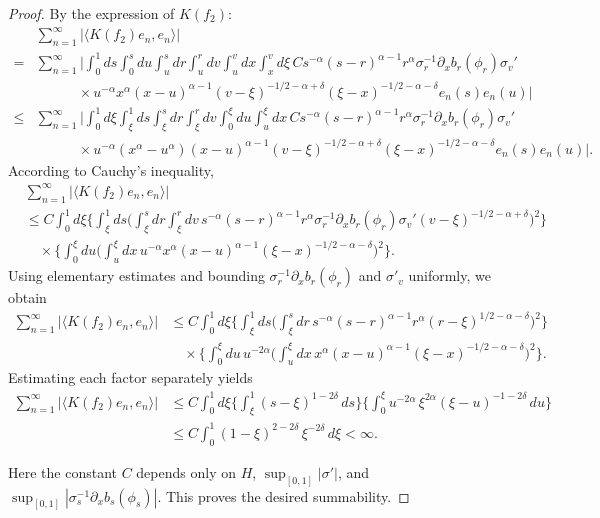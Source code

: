 \documentclass[preprint,12pt]{elsarticle}
\theoremstyle{definition}  %
\theoremstyle{plain}  %
\begin{document}
\begin{proof}
By the expression of $K(f_2)$:
\begin{align*}
   &\sum_{n=1}^\infty \big|\langle K(f_2)e_n,e_n \rangle\big| \\
   =& \sum_{n=1}^\infty \Bigg|\int_0^1 ds \int_0^s du \int_u^s dr \int_u^r dv \int_u^v dx \int_x^v d\xi \,
       C s^{-\alpha} (s-r)^{\alpha-1} r^\alpha 
       \sigma_r^{-1}\partial_x b_r(\phi_r)\sigma_v' \\
   &\quad \qquad \times u^{-\alpha} x^\alpha (x-u)^{\alpha-1} 
       (v-\xi)^{-1/2-\alpha+\delta}(\xi-x)^{-1/2-\alpha-\delta} 
       e_n(s)e_n(u)\Bigg| \\
  \leq & \sum_{n=1}^\infty \Bigg|\int_0^1 d\xi \int_\xi^1 ds \int_\xi^s dr \int_\xi^r dv \int_0^\xi du \int_u^\xi dx \,
       C s^{-\alpha} (s-r)^{\alpha-1} r^\alpha 
       \sigma_r^{-1}\partial_x b_r(\phi_r)\sigma_v' \\
  & \quad\qquad \times u^{-\alpha} (x^\alpha-u^\alpha)(x-u)^{\alpha-1} 
       (v-\xi)^{-1/2-\alpha+\delta}(\xi-x)^{-1/2-\alpha-\delta} 
       e_n(s)e_n(u)\Bigg| .
\end{align*}
According to Cauchy's inequality, 
\begin{align*}
   &\sum_{n=1}^\infty \big|\langle K(f_2)e_n,e_n \rangle\big| \\
   &\leq C \int_0^1 d\xi 
     \Bigg\{\int_\xi^1 ds 
     \Bigg(\int_\xi^s dr \int_\xi^r dv \, 
       s^{-\alpha}(s-r)^{\alpha-1} r^\alpha 
       \sigma_r^{-1}\partial_x b_r(\phi_r)\sigma_v' 
       (v-\xi)^{-1/2-\alpha+\delta}\Bigg)^2 \Bigg\} \\
   &\quad \times \Bigg\{\int_0^\xi du 
     \Bigg(\int_u^\xi dx \, 
       u^{-\alpha} x^\alpha (x-u)^{\alpha-1} 
       (\xi-x)^{-1/2-\alpha-\delta}\Bigg)^2 \Bigg\}.
\end{align*}
Using elementary estimates and bounding $\sigma_r^{-1}\partial_x b_r(\phi_r)$ and $\sigma'_v$ uniformly, we obtain
\begin{align*}
   \sum_{n=1}^\infty \big|\langle K(f_2)e_n,e_n \rangle\big|
   &\leq C \int_0^1 d\xi 
      \Bigg\{\int_\xi^1 ds 
        \Bigg(\int_\xi^s dr \, s^{-\alpha}(s-r)^{\alpha-1}r^\alpha (r-\xi)^{1/2-\alpha-\delta}\Bigg)^2 \Bigg\} \\
   &\quad \times \Bigg\{\int_0^\xi du \, u^{-2\alpha} 
        \Bigg(\int_u^\xi dx \, x^\alpha (x-u)^{\alpha-1} (\xi-x)^{-1/2-\alpha-\delta}\Bigg)^2 \Bigg\}.
\end{align*}
Estimating each factor separately yields
\begin{align*}
   \sum_{n=1}^\infty \big|\langle K(f_2)e_n,e_n \rangle\big|
   &\leq C \int_0^1 d\xi 
        \Bigg\{\int_\xi^1 (s-\xi)^{1-2\delta}\, ds \Bigg\} 
        \Bigg\{\int_0^\xi u^{-2\alpha}\, \xi^{2\alpha}(\xi-u)^{-1-2\delta}\, du \Bigg\} \\
   &\leq C \int_0^1 (1-\xi)^{2-2\delta}\, \xi^{-2\delta}\, d\xi < \infty .
\end{align*}

Here the constant $C$ depends only on $H$, $\sup_{[0,1]}|\sigma'|$, and 
$\sup_{[0,1]}|\sigma_s^{-1}\partial_x b_s(\phi_s)|$.  
This proves the desired summability.


\end{proof}
\end{document}
